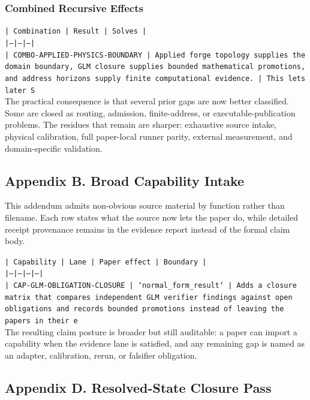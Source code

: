 \documentclass[11pt]{article}
\begin{document}
\subsubsection*{Combined Recursive Effects}

\noindent\texttt{| Combination | Result | Solves |}\\
\noindent\texttt{|---|---|---|}\\
\noindent\texttt{| COMBO-APPLIED-PHYSICS-BOUNDARY | Applied forge topology supplies the domain boundary, GLM closure supplies bounded mathematical promotions, and address horizons supply finite computational evidence. | This lets later S}\\

The practical consequence is that several prior gaps are now better classified. Some are closed as routing, admission, finite-address, or executable-publication problems. The residues that remain are sharper: exhaustive source intake, physical calibration, full paper-local runner parity, external measurement, and domain-specific validation.

\subsection*{Appendix B. Broad Capability Intake}

This addendum admits non-obvious source material by function rather than filename. Each row states what the source now lets the paper do, while detailed receipt provenance remains in the evidence report instead of the formal claim body.

\noindent\texttt{| Capability | Lane | Paper effect | Boundary |}\\
\noindent\texttt{|---|---|---|---|}\\
\noindent\texttt{| CAP-GLM-OBLIGATION-CLOSURE | `normal\_form\_result` | Adds a closure matrix that compares independent GLM verifier findings against open obligations and records bounded promotions instead of leaving the papers in their e}\\

The resulting claim posture is broader but still auditable: a paper can import a capability when the evidence lane is satisfied, and any remaining gap is named as an adapter, calibration, rerun, or falsifier obligation.

\subsection*{Appendix D. Resolved-State Closure Pass}
\end{document}

